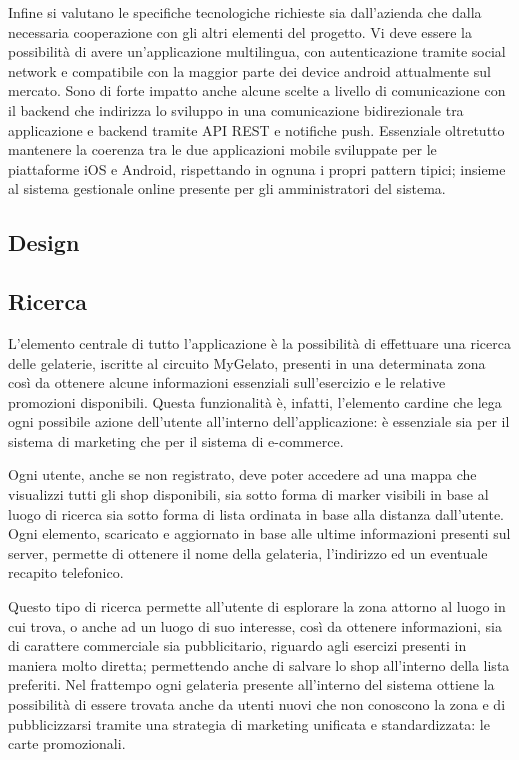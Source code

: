 Infine si valutano le specifiche tecnologiche richieste sia dall'azienda che dalla necessaria cooperazione con gli altri elementi del progetto.
Vi deve essere la possibilità di avere un'applicazione multilingua, con autenticazione tramite social network e compatibile con la maggior parte dei device android attualmente sul mercato.
Sono di forte impatto anche alcune scelte a livello di comunicazione con il backend che indirizza lo sviluppo in una comunicazione bidirezionale tra applicazione e backend tramite API REST e notifiche push.
Essenziale oltretutto mantenere la coerenza tra le due applicazioni mobile sviluppate per le piattaforme iOS e Android, rispettando in ognuna i propri pattern tipici; insieme al sistema gestionale online presente per gli amministratori del sistema.

\subsection{Design}


\subsection{Ricerca}
L'elemento centrale di tutto l'applicazione è la possibilità di effettuare una ricerca delle gelaterie, iscritte al circuito MyGelato, presenti in una determinata zona così da ottenere alcune informazioni essenziali sull'esercizio e le relative promozioni disponibili.
Questa funzionalità è, infatti, l'elemento cardine che lega ogni possibile azione dell'utente all'interno dell'applicazione: è essenziale sia per il sistema di marketing che per il sistema di e-commerce.

Ogni utente, anche se non registrato, deve poter accedere ad una mappa che visualizzi tutti gli shop disponibili, sia sotto forma di marker visibili in base al luogo di ricerca sia sotto forma di lista ordinata in base alla distanza dall'utente.
Ogni elemento, scaricato e aggiornato in base alle ultime informazioni presenti sul server, permette di ottenere il nome della gelateria, l'indirizzo ed un eventuale recapito telefonico.

Questo tipo di ricerca permette all'utente di esplorare la zona attorno al luogo in cui trova, o anche ad un luogo di suo interesse, così da ottenere informazioni, sia di carattere commerciale sia pubblicitario, riguardo agli esercizi presenti in maniera molto diretta; permettendo anche di salvare lo shop all'interno della lista preferiti.
Nel frattempo ogni gelateria presente all'interno del sistema ottiene la possibilità di essere trovata anche da utenti nuovi che non conoscono la zona e di pubblicizzarsi tramite una strategia di marketing unificata e standardizzata: le carte promozionali.

